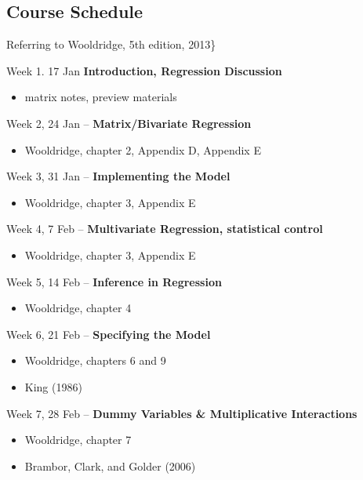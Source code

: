 \documentclass[
  letterpaper,
  DIV=11,
  numbers=noendperiod]{scrartcl}
\providecommand{\tightlist}{%
  \setlength{\itemsep}{0pt}\setlength{\parskip}{0pt}}\usepackage{longtable,booktabs,array}
\begin{document}
\hypertarget{course-schedule}{%
\subsection{Course Schedule}\label{course-schedule}}

Referring to Wooldridge, 5th edition, 2013\}

Week 1. 17 Jan \textbf{Introduction, Regression Discussion }

\begin{itemize}
\tightlist
\item
  matrix notes, preview materials
\end{itemize}

Week 2, 24 Jan -- \textbf{Matrix/Bivariate Regression}

\begin{itemize}
\tightlist
\item
  Wooldridge, chapter 2, Appendix D, Appendix E
\end{itemize}

Week 3, 31 Jan -- \textbf{Implementing the Model}

\begin{itemize}
\tightlist
\item
  Wooldridge, chapter 3, Appendix E
\end{itemize}

Week 4, 7 Feb -- \textbf{Multivariate Regression, statistical control}

\begin{itemize}
\tightlist
\item
  Wooldridge, chapter 3, Appendix E
\end{itemize}

Week 5, 14 Feb -- \textbf{Inference in Regression}

\begin{itemize}
\tightlist
\item
  Wooldridge, chapter 4
\end{itemize}

Week 6, 21 Feb -- \textbf{Specifying the Model}

\begin{itemize}
\tightlist
\item
  Wooldridge, chapters 6 and 9
\item
  King (1986)
\end{itemize}

Week 7, 28 Feb -- \textbf{Dummy Variables \& Multiplicative
Interactions}

\begin{itemize}
\tightlist
\item
  Wooldridge, chapter 7
\item
  Brambor, Clark, and Golder (2006)
\end{itemize}
\end{document}
